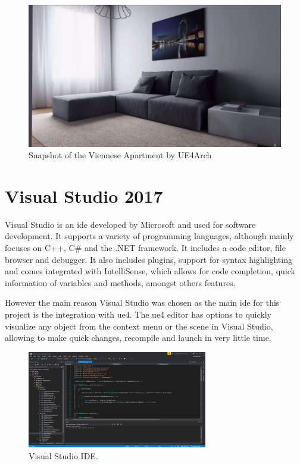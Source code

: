 \begin{figure}[h]
	\includegraphics[scale=0.2]{archivos/london_apartment.png}
	\centering
	\caption[Snapshot of the Viennese Apartbent by UE4Arch]{Snapshot of the Viennese Apartment by UE4Arch\footnotemark}
	\label{fig:london_apartment}
\end{figure}

\section{Visual Studio 2017}
Visual Studio is an \gls{ide} developed by Microsoft and used for software development. It supports a variety of programming languages, although mainly focuses on C++, C\# and the .NET framework. It includes a code editor, file browser and debugger. It also includes plugins, support for syntax highlighting and comes integrated with IntelliSense, which allows for code completion, quick information of variables and methods, amongst others features.

However the main reason Visual Studio was chosen as the main \gls{ide} for this project is the integration with \gls{ue4}. The \gls{ue4} editor has options to quickly visualize any object from the context menu or the scene in Visual Studio, allowing to make quick changes, recompile and launch in very little time.

\begin{figure}[h]
	\includegraphics[width=0.7\textwidth]{archivos/vs_ide.png}
	\centering
	\caption{Visual Studio IDE.}
	\label{fig:visual_studio}
\end{figure}

